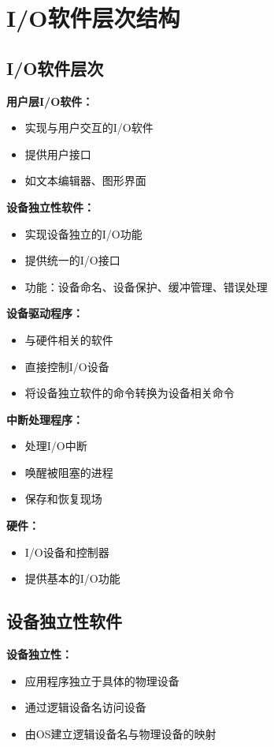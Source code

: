 \documentclass[lang=cn,newtx,10pt,scheme=chinese]{../../elegantbook}
\begin{document}
\section{I/O软件层次结构}

\subsection{I/O软件层次}

\textbf{用户层I/O软件：}
\begin{itemize}
  \item 实现与用户交互的I/O软件
  \item 提供用户接口
  \item 如文本编辑器、图形界面
\end{itemize}

\textbf{设备独立性软件：}
\begin{itemize}
  \item 实现设备独立的I/O功能
  \item 提供统一的I/O接口
  \item 功能：设备命名、设备保护、缓冲管理、错误处理
\end{itemize}

\textbf{设备驱动程序：}
\begin{itemize}
  \item 与硬件相关的软件
  \item 直接控制I/O设备
  \item 将设备独立软件的命令转换为设备相关命令
\end{itemize}

\textbf{中断处理程序：}
\begin{itemize}
  \item 处理I/O中断
  \item 唤醒被阻塞的进程
  \item 保存和恢复现场
\end{itemize}

\textbf{硬件：}
\begin{itemize}
  \item I/O设备和控制器
  \item 提供基本的I/O功能
\end{itemize}

\subsection{设备独立性软件}

\textbf{设备独立性：}
\begin{itemize}
  \item 应用程序独立于具体的物理设备
  \item 通过逻辑设备名访问设备
  \item 由OS建立逻辑设备名与物理设备的映射
\end{itemize}
\end{document}
